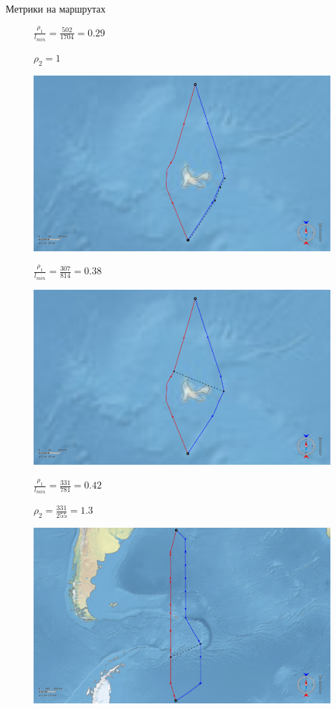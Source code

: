 \documentclass[russian, hyperref={unicode}]{beamer}
\begin{document}
\begin{frame}[t]{Метрики на маршрутах}
{\begin{figure}
            $\frac{\rho_1}{l_{min}} = \frac{502}{1704} = 0.29$

            $\rho_2 = 1$
        \end{figure}
    }
     {
        \begin{figure}
            \includegraphics[width=.9\textwidth]{Solution/metrics/1-uncertain-2-dissimilar-gclosest}
            
            $\frac{\rho_1}{l_{min}} = \frac{307}{814} = 0.38$
        \end{figure}
    }
     {
        \begin{figure}
            \includegraphics[width=.9\textwidth]{Solution/metrics/1-uncertain-2-dissimilar-closest}
            
            $\frac{\rho_1}{l_{min}} = \frac{331}{781} = 0.42$

            $\rho_2 = \frac{331}{255} = 1.3$
        \end{figure}
    }
     {
        \begin{figure}
            \includegraphics[width=.9\textwidth]{Solution/metrics/1-similar}
            

\end{figure}}
\end{frame}
\end{document}
